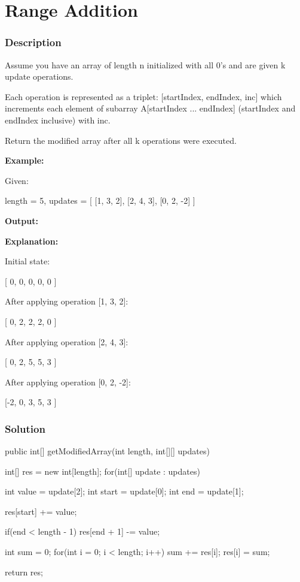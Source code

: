 \newpage

\section{Range Addition} %

\subsubsection{Description}
Assume you have an array of length n initialized with all 0's and are given k update operations.

Each operation is represented as a triplet: [startIndex, endIndex, inc] which increments each element of subarray A[startIndex ... endIndex] (startIndex and endIndex inclusive) with inc.

Return the modified array after all k operations were executed.

\textbf{Example:}

Given:
\begin{Code}
    length = 5,
    updates = [
        [1,  3,  2],
        [2,  4,  3],
        [0,  2, -2]
    ]
\end{Code}

\textbf{Output:}

\begin{Code}
    [-2, 0, 3, 5, 3]
\end{Code}

\textbf{Explanation:}

Initial state:

[ 0, 0, 0, 0, 0 ]

After applying operation [1, 3, 2]:

[ 0, 2, 2, 2, 0 ]

After applying operation [2, 4, 3]:

[ 0, 2, 5, 5, 3 ]

After applying operation [0, 2, -2]:

[-2, 0, 3, 5, 3 ]
\subsubsection{Solution}

\begin{Code}
public int[] getModifiedArray(int length, int[][] updates) {
    int[] res = new int[length];
    for(int[] update : updates) {
        int value = update[2];
        int start = update[0];
        int end = update[1];

        res[start] += value;

        if(end < length - 1)
            res[end + 1] -= value;

    }

    int sum = 0;
    for(int i = 0; i < length; i++) {
        sum += res[i];
        res[i] = sum;
    }

    return res;
}
\end{Code}

